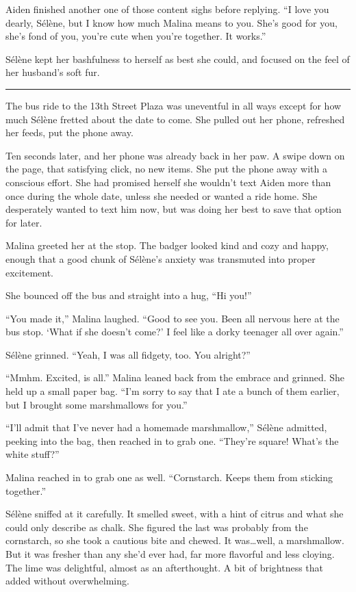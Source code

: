 Aiden finished another one of those content sighs before replying. ``I love you dearly, Sélène, but I know how much Malina means to you. She's good for you, she's fond of you, you're cute when you're together. It works.''

Sélène kept her bashfulness to herself as best she could, and focused on the feel of her husband's soft fur.

\begin{center}\rule{0.5\linewidth}{\linethickness}\end{center}

The bus ride to the 13th Street Plaza was uneventful in all ways except for how much Sélène fretted about the date to come. She pulled out her phone, refreshed her feeds, put the phone away.

Ten seconds later, and her phone was already back in her paw. A swipe down on the page, that satisfying click, no new items. She put the phone away with a conscious effort. She had promised herself she wouldn't text Aiden more than once during the whole date, unless she needed or wanted a ride home. She desperately wanted to text him now, but was doing her best to save that option for later.

Malina greeted her at the stop. The badger looked kind and cozy and happy, enough that a good chunk of Sélène's anxiety was transmuted into proper excitement.

She bounced off the bus and straight into a hug, ``Hi you!''

``You made it,'' Malina laughed. ``Good to see you. Been all nervous here at the bus stop. `What if she doesn't come?' I feel like a dorky teenager all over again.''

Sélène grinned. ``Yeah, I was all fidgety, too. You alright?''

``Mmhm. Excited, is all.'' Malina leaned back from the embrace and grinned. She held up a small paper bag. ``I'm sorry to say that I ate a bunch of them earlier, but I brought some marshmallows for you.''

``I'll admit that I've never had a homemade marshmallow,'' Sélène admitted, peeking into the bag, then reached in to grab one. ``They're square! What's the white stuff?''

Malina reached in to grab one as well. ``Cornstarch. Keeps them from sticking together.''

Sélène sniffed at it carefully. It smelled sweet, with a hint of citrus and what she could only describe as chalk. She figured the last was probably from the cornstarch, so she took a cautious bite and chewed. It was\ldots{}well, a marshmallow. But it was fresher than any she'd ever had, far more flavorful and less cloying. The lime was delightful, almost as an afterthought. A bit of brightness that added without overwhelming.

